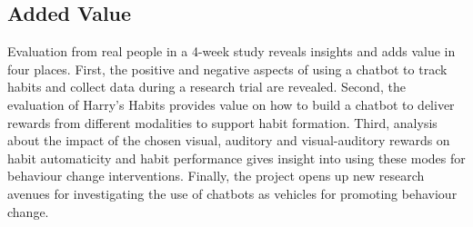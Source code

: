 
\subsection{Added Value}
Evaluation from real people in a 4-week study reveals insights and adds value in four places. First, the positive and negative aspects of using a chatbot to track habits and collect data during a research trial are revealed. Second, the evaluation of Harry's Habits provides value on how to build a chatbot to deliver rewards from different modalities to support habit formation. Third, analysis about the impact of the chosen visual, auditory and visual-auditory rewards on habit automaticity and habit performance gives insight into using these modes for behaviour change interventions. Finally, the project opens up new research avenues for investigating the use of chatbots as vehicles for promoting behaviour change.
\newpage
